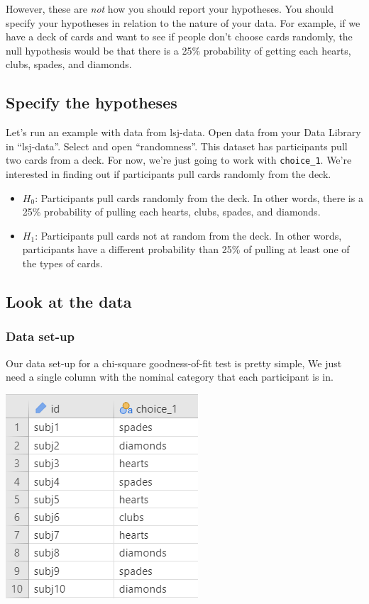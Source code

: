 \documentclass[
]{book}
\begin{document}
However, these are \emph{not} how you should report your hypotheses. You should specify your hypotheses in relation to the nature of your data. For example, if we have a deck of cards and want to see if people don't choose cards randomly, the null hypothesis would be that there is a 25\% probability of getting each hearts, clubs, spades, and diamonds.

\hypertarget{specify-the-hypotheses-1}{%
\subsection{Specify the hypotheses}\label{specify-the-hypotheses-1}}

Let's run an example with data from lsj-data. Open data from your Data Library in ``lsj-data''. Select and open ``randomness''. This dataset has participants pull two cards from a deck. For now, we're just going to work with \texttt{choice\_1}. We're interested in finding out if participants pull cards randomly from the deck.

\begin{itemize}
\item
  \(H_0\): Participants pull cards randomly from the deck. In other words, there is a 25\% probability of pulling each hearts, clubs, spades, and diamonds.
\item
  \(H_1\): Participants pull cards not at random from the deck. In other words, participants have a different probability than 25\% of pulling at least one of the types of cards.
\end{itemize}

\hypertarget{look-at-the-data-3}{%
\subsection{Look at the data}\label{look-at-the-data-3}}

\hypertarget{data-set-up-3}{%
\subsubsection{Data set-up}\label{data-set-up-3}}

Our data set-up for a chi-square goodness-of-fit test is pretty simple, We just need a single column with the nominal category that each participant is in.

\includegraphics{images/09-chi-square/chi-square_data.png}
\end{document}

